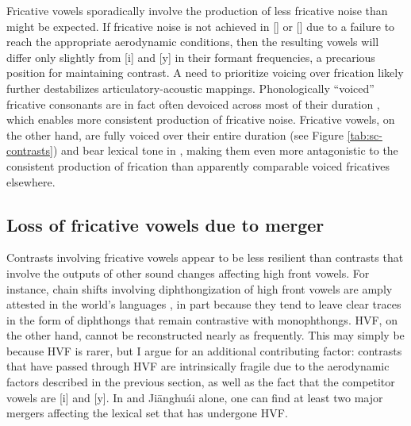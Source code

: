 \documentclass[output=paper,hidelinks]{langscibook}
\begin{document}
Fricative vowels sporadically involve the production of less fricative noise than might be expected.
%
If fricative noise is not achieved in [\iz{}] or [\yz{}] due to a failure to reach the appropriate aerodynamic conditions, then the resulting vowels will differ only slightly from [i] and [y] in their formant frequencies, a precarious position for maintaining contrast.
%
A need to prioritize voicing over frication likely further destabilizes articulatory-acoustic mappings.
%
Phonologically ``voiced'' fricative consonants are in fact often devoiced across most of their duration \citep{haggard, stevens-fricative}, which enables more consistent production of fricative noise. Fricative vowels, on the other hand, are fully voiced over their entire duration (see Figure \ref{tab:sc-contrasts}) and bear lexical tone in \THW{}, making them even more antagonistic to the consistent production of frication than apparently comparable voiced fricatives elsewhere.


\subsection{Loss of fricative vowels due to merger}\label{sec:faytak:4.3}

Contrasts involving fricative vowels appear to be less resilient than contrasts that involve the outputs of other sound changes affecting high front vowels.
%
For instance, chain shifts involving diphthongization of high front vowels are amply attested in the world's languages \citep{labov-principles}, in part because they tend to leave clear traces in the form of diphthongs that remain contrastive with monophthongs. HVF, on the other hand, cannot be reconstructed nearly as frequently. This may simply be because HVF is rarer, but I argue for an additional contributing factor: contrasts that have passed through HVF are intrinsically fragile due to the aerodynamic factors described in the previous section, as well as the fact that the competitor vowels are [i] and [y].
%
In \THW{} and Ji\={a}nghu\'{a}i  alone, one can find at least two major mergers affecting the lexical set that has undergone HVF.
\end{document}
